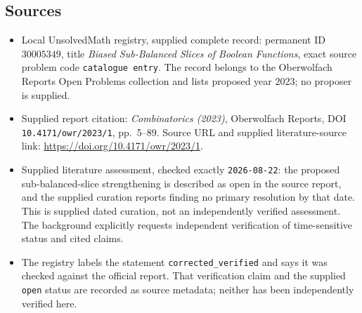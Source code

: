 \documentclass[11pt]{article}
\begin{document}
\subsection{Sources}
\begin{itemize}
\item Local UnsolvedMath registry, supplied complete record: permanent ID \(30005349\), title \emph{Biased Sub-Balanced Slices of Boolean Functions}, exact source problem code \texttt{catalogue entry}. The record belongs to the Oberwolfach Reports Open Problems collection and lists proposed year \(2023\); no proposer is supplied.
\item Supplied report citation: \emph{Combinatorics (2023)}, Oberwolfach Reports, DOI \texttt{10.4171/owr/2023/1}, pp.\ 5--89. Source URL and supplied literature-source link: \url{https://doi.org/10.4171/owr/2023/1}.
\item Supplied literature assessment, checked exactly \texttt{2026-08-22}: the proposed sub-balanced-slice strengthening is described as open in the source report, and the supplied curation reports finding no primary resolution by that date. This is supplied dated curation, not an independently verified assessment. The background explicitly requests independent verification of time-sensitive status and cited claims.
\item The registry labels the statement \texttt{corrected\_verified} and says it was checked against the official report. That verification claim and the supplied \texttt{open} status are recorded as source metadata; neither has been independently verified here.
\end{itemize}
\end{document}

